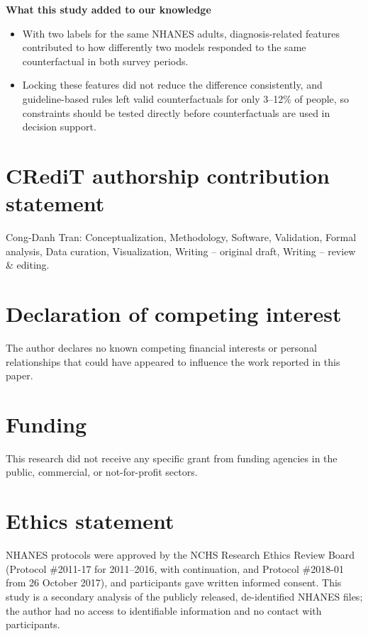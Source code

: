 \documentclass[preprint,review,12pt,times]{elsarticle}
\providecommand{\tightlist}{\setlength{\itemsep}{0pt}\setlength{\parskip}{0pt}}
\begin{document}
\textbf{What this study added to our knowledge}

\begin{itemize}
\tightlist
\item
  With two labels for the same NHANES adults, diagnosis-related features
  contributed to how differently two models responded to the same
  counterfactual in both survey periods.
\item
  Locking these features did not reduce the difference consistently, and
  guideline-based rules left valid counterfactuals for only 3--12\% of
  people, so constraints should be tested directly before
  counterfactuals are used in decision support.
\end{itemize}

\section*{CRediT authorship contribution statement}

Cong-Danh Tran: Conceptualization, Methodology, Software, Validation,
Formal analysis, Data curation, Visualization, Writing -- original
draft, Writing -- review \& editing.

\section*{Declaration of competing interest}

The author declares no known competing financial interests or personal
relationships that could have appeared to influence the work reported in
this paper.

\section*{Funding}

This research did not receive any specific grant from funding agencies
in the public, commercial, or not-for-profit sectors.

\section*{Ethics statement}

NHANES protocols were approved by the NCHS Research Ethics Review Board
(Protocol \#2011-17 for 2011--2016, with continuation, and Protocol
\#2018-01 from 26 October 2017), and participants gave written informed
consent. This study is a secondary analysis of the publicly released,
de-identified NHANES files; the author had no access to identifiable
information and no contact with participants.
\end{document}
